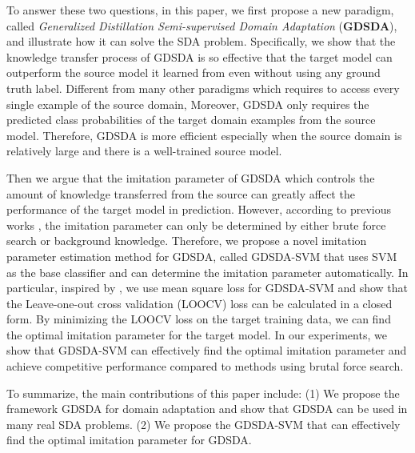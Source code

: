 To answer these two questions, in this paper, we first propose a new paradigm, called \textit{Generalized Distillation Semi-supervised Domain Adaptation} (\textbf{GDSDA}), and illustrate how it can solve the SDA problem. 
Specifically, we show that the knowledge transfer process of GDSDA is so effective that the target model can outperform the source model it learned from even without using any ground truth label. 
Different from many other paradigms which requires to access every single example of the source domain, Moreover, GDSDA only requires the predicted class probabilities of the target domain examples from the source model. Therefore, GDSDA is more efficient especially when the source domain is relatively large and there is a well-trained source model.

Then we argue that the imitation parameter of GDSDA which controls the amount of knowledge transferred from the source can greatly affect the performance of the target model in prediction.
However, according to previous works \cite{lopez2015unifying,Tzeng_2015_ICCV}, the imitation parameter can only be determined by either brute force search or background knowledge. 
Therefore, we propose a novel imitation parameter estimation method for GDSDA, called GDSDA-SVM that uses SVM as the base classifier and can determine the imitation parameter automatically. In particular, inspired by \cite{cawley2006leave}, we use mean square loss for GDSDA-SVM and show that the Leave-one-out cross validation (LOOCV) loss can be calculated in a closed form. By minimizing the LOOCV loss on the target training data, we can find the optimal imitation parameter for the target model. In our experiments, we show that GDSDA-SVM can effectively find the optimal imitation parameter and achieve competitive performance compared to methods using brutal force search. 

To summarize, the main contributions of this paper include: (1) We propose the framework GDSDA for domain adaptation and show that GDSDA can be used in many real SDA problems. (2) We propose the GDSDA-SVM that can effectively find the optimal imitation parameter for GDSDA.

